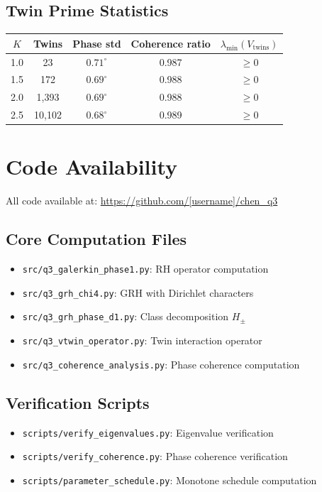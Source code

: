 \subsection{Twin Prime Statistics}

\begin{center}
\begin{tabular}{ccccc}
\toprule
$K$ & Twins & Phase std & Coherence ratio & $\lambda_{\min}(V_{\mathrm{twins}})$ \\
\midrule
1.0 & 23 & $0.71^\circ$ & 0.987 & $\geq 0$ \\
1.5 & 172 & $0.69^\circ$ & 0.988 & $\geq 0$ \\
2.0 & 1,393 & $0.69^\circ$ & 0.988 & $\geq 0$ \\
2.5 & 10,102 & $0.68^\circ$ & 0.989 & $\geq 0$ \\
\bottomrule
\end{tabular}
\end{center}

\section{Code Availability}\label{app:code}

All code available at: \url{https://github.com/[username]/chen_q3}

\subsection{Core Computation Files}

\begin{itemize}
  \item \texttt{src/q3\_galerkin\_phase1.py}: RH operator computation
  \item \texttt{src/q3\_grh\_chi4.py}: GRH with Dirichlet characters
  \item \texttt{src/q3\_grh\_phase\_d1.py}: Class decomposition $H_\pm$
  \item \texttt{src/q3\_vtwin\_operator.py}: Twin interaction operator
  \item \texttt{src/q3\_coherence\_analysis.py}: Phase coherence computation
\end{itemize}

\subsection{Verification Scripts}

\begin{itemize}
  \item \texttt{scripts/verify\_eigenvalues.py}: Eigenvalue verification
  \item \texttt{scripts/verify\_coherence.py}: Phase coherence verification
  \item \texttt{scripts/parameter\_schedule.py}: Monotone schedule computation
\end{itemize}

